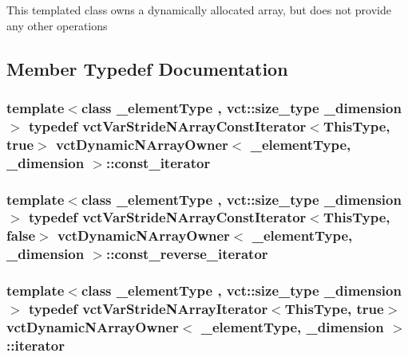 This templated class owns a dynamically allocated array, but does not provide any other operations 

\subsection{Member Typedef Documentation}
\hypertarget{classvct_dynamic_n_array_owner_a81e092a15fe8a5bf0777a8b1f9cc8e4a}{
\subsubsection[{const\-\_\-iterator}]{\setlength{\rightskip}{0pt plus 5cm}template$<$class \-\_\-element\-Type , vct\-::size\-\_\-type \-\_\-dimension$>$ typedef {\bf vct\-Var\-Stride\-N\-Array\-Const\-Iterator}$<${\bf This\-Type}, true$>$ {\bf vct\-Dynamic\-N\-Array\-Owner}$<$ \-\_\-element\-Type, \-\_\-dimension $>$\-::{\bf const\-\_\-iterator}}}\label{classvct_dynamic_n_array_owner_a81e092a15fe8a5bf0777a8b1f9cc8e4a}
\hypertarget{classvct_dynamic_n_array_owner_a3c8cf0902cf51a404fc00cee4aac3f46}{
\subsubsection[{const\-\_\-reverse\-\_\-iterator}]{\setlength{\rightskip}{0pt plus 5cm}template$<$class \-\_\-element\-Type , vct\-::size\-\_\-type \-\_\-dimension$>$ typedef {\bf vct\-Var\-Stride\-N\-Array\-Const\-Iterator}$<${\bf This\-Type}, false$>$ {\bf vct\-Dynamic\-N\-Array\-Owner}$<$ \-\_\-element\-Type, \-\_\-dimension $>$\-::{\bf const\-\_\-reverse\-\_\-iterator}}}\label{classvct_dynamic_n_array_owner_a3c8cf0902cf51a404fc00cee4aac3f46}
\hypertarget{classvct_dynamic_n_array_owner_a48e740eae5c0a1654e5e93b12d388c19}{
\subsubsection[{iterator}]{\setlength{\rightskip}{0pt plus 5cm}template$<$class \-\_\-element\-Type , vct\-::size\-\_\-type \-\_\-dimension$>$ typedef {\bf vct\-Var\-Stride\-N\-Array\-Iterator}$<${\bf This\-Type}, true$>$ {\bf vct\-Dynamic\-N\-Array\-Owner}$<$ \-\_\-element\-Type, \-\_\-dimension $>$\-::{\bf iterator}}}\label{classvct_dynamic_n_array_owner_a48e740eae5c0a1654e5e93b12d388c19}
